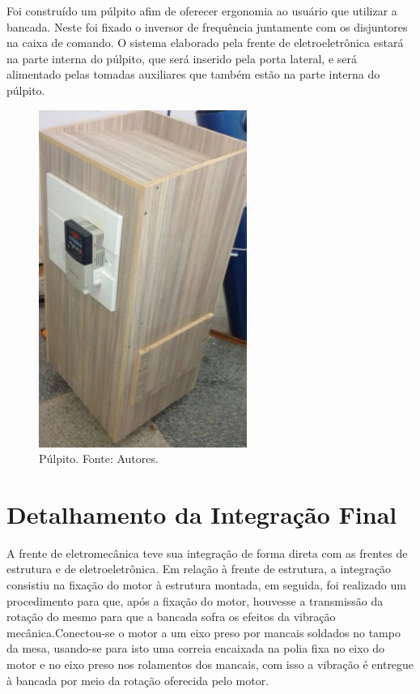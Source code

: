Foi construído um púlpito afim de oferecer ergonomia ao usuário que utilizar a bancada. Neste foi fixado o inversor de frequência juntamente com os disjuntores na caixa de comando. O sistema elaborado pela frente de eletroeletrônica estará na parte interna do púlpito, que será inserido pela porta lateral, e será alimentado pelas tomadas auxiliares que também estão na parte interna do púlpito.


\begin{figure}[h]
    \centering      \includegraphics[keepaspectratio=true,scale=0.9]{figuras/pulpito.png}
    \caption{Púlpito. Fonte: Autores.}
    \label{pulpito}
\end{figure}

\section{Detalhamento da Integração Final}

A frente de eletromecânica teve sua integração de forma direta com as frentes de estrutura e de eletroeletrônica.
Em relação à frente de estrutura, a integração consistiu na fixação do motor à estrutura montada, em seguida, foi realizado um procedimento para que, após a fixação do motor, houvesse a transmissão da rotação do mesmo para que a bancada sofra os efeitos da vibração mecânica.Conectou-se o motor a um eixo preso por mancais soldados no tampo da mesa, usando-se para isto uma correia encaixada na polia fixa no eixo do motor e no eixo preso nos rolamentos dos mancais, com isso a vibração é entregue à bancada por meio da rotação oferecida pelo motor.

